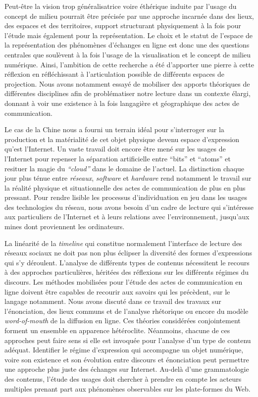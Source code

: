 Peut-être la vision trop généralisatrice voire éthérique induite par l{\textquoteright}usage du concept de milieu pourrait être précisée par une approche incarnée dans des lieux, des espaces et des territoires, support structurant physiquement à la fois pour l{\textquoteright}étude mais également pour la représentation. Le choix et le statut de l'espace de la représentation des phénomènes d'échanges en ligne est donc une des questions centrales que soulèvent à la fois l'usage de la visualisation et le concept de milieu numérique. Ainsi, l'ambition de cette recherche a été d'apporter une pierre à cette réflexion en réfléchissant à l'articulation possible de différents espaces de projection. Nous avons notamment essayé de mobiliser des apports théoriques de différentes disciplines afin de problématiser notre lecture dans un contexte élargi, donnant à voir une existence à la fois langagière et géographique des actes de communication. 


Le cas de la Chine nous a fourni un terrain idéal pour s'interroger sur la production et la matérialité de cet objet physique devenu espace d'expression qu'est l'Internet. Un vaste travail doit encore être mené sur les usages de l'Internet pour repenser  la séparation artificielle entre ``bits'' et ``atoms'' et resituer la magie du \textit{``cloud''} dans le domaine de l'actuel. La distinction chaque jour plus ténue entre \textit{réseaux}, \textit{software} et \textit{hardware} rend notamment le travail sur la réalité physique et situationnelle des actes de communication de plus en plus pressant. Pour rendre lisible les processus d'individuation en jeu dans les usages des technologies du réseau, nous avons besoin d'un cadre de lecture qui s'intéresse aux particuliers de l'Internet et à leurs relations avec l'environnement, jusqu'aux mines dont proviennent les ordinateurs.

La linéarité de la \textit{timeline} qui constitue normalement l'interface de lecture des réseaux sociaux ne doit pas non plus éclipser la diversité des formes d'expressions qui s'y déroulent. L'analyse de différents types de contenus nécessitent le recours à des approches particulières, héritées des réflexions sur les différents régimes du discours. Les méthodes mobilisées pour l'étude des actes de communication en ligne doivent être capables de recourir aux savoirs qui les précèdent, sur le langage notamment. Nous avons discuté dans ce travail des travaux sur l'énonciation, des lieux communs et de l'analyse rhétorique ou encore du modèle \textit{word-of-mouth} de la diffusion en ligne. Ces théories considérées conjointement forment un ensemble en apparence hétéroclite. Néanmoins, chacune de ces approches peut faire sens si elle est invoquée pour l'analyse d'un type de contenu adéquat. Identifier le régime d'expression qui accompagne un objet numérique, voire son existence et son évolution entre discours et énonciation peut permettre une approche plus juste des échanges sur Internet. Au-delà d'une grammatologie des contenus, l'étude des usages doit chercher à prendre en compte les acteurs multiples prenant part aux phénomènes observables sur les plate-formes du Web. 

